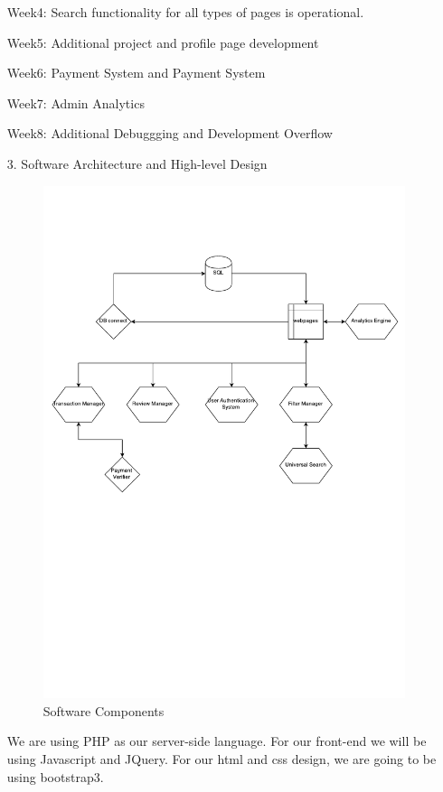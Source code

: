 \documentclass[12pt]{article}
\begin{document}
\begin{enumerate}
Week4: Search functionality for all types of pages is operational.

Week5: Additional project and profile page development

Week6: Payment System and Payment System

Week7: Admin Analytics

Week8: Additional Debuggging and Development Overflow

\item[3.] Software Architecture and High-level Design
\begin{figure}[ht!]
\centering
\includegraphics[width=150mm]{swag.pdf}
\caption{Software Components \label{overflow}}
\end{figure}

We are using PHP as our server-side language. For our front-end we will be using Javascript and JQuery. For our html and css design, we are going to be using bootstrap3.


\end{enumerate}
\end{document}
